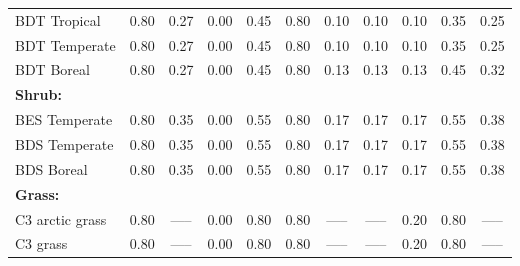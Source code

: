 \begin{landscape}
\begin{table}[htbp]
\begin{tabular}{lcccccccccc}
      BDT Tropical                          & 0.80                 & 0.27                 & 0.00                 & 0.45               & 0.80                & 0.10                      & 0.10                    & 0.10                & 0.35              & 0.25                      \\
      BDT Temperate                         & 0.80                 & 0.27                 & 0.00                 & 0.45               & 0.80                & 0.10                      & 0.10                    & 0.10                & 0.35              & 0.25                      \\
      BDT Boreal                            & 0.80                 & 0.27                 & 0.00                 & 0.45               & 0.80                & 0.13                      & 0.13                    & 0.13                & 0.45              & 0.32                      \\ \hline
      \multicolumn{11}{l}{\textbf{Shrub:}} \\
      BES Temperate                         & 0.80                 & 0.35                 & 0.00                 & 0.55               & 0.80                & 0.17                      & 0.17                    & 0.17                & 0.55              & 0.38                      \\
      BDS Temperate                         & 0.80                 & 0.35                 & 0.00                 & 0.55               & 0.80                & 0.17                      & 0.17                    & 0.17                & 0.55              & 0.38                      \\
      BDS Boreal                            & 0.80                 & 0.35                 & 0.00                 & 0.55               & 0.80                & 0.17                      & 0.17                    & 0.17                & 0.55              & 0.38                      \\ \hline
      \multicolumn{11}{l}{\textbf{Grass:}} \\
      C3  arctic grass                      & 0.80                 & -----                & 0.00                 & 0.80               & 0.80                & -----                     & -----                   & 0.20                & 0.80              & -----                     \\
      C3  grass                             & 0.80                 & -----                & 0.00                 & 0.80               & 0.80                & -----                     & -----                   & 0.20                & 0.80              & -----                     \\

\end{tabular}
\end{table}
\end{landscape}

